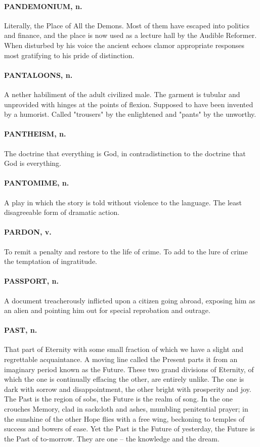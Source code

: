 \documentclass[11pt]{article}
\begin{document}
\paragraph{PANDEMONIUM, n.}  Literally, the Place of All the Demons.  Most of them
have escaped into politics and finance, and the place is now used as a
lecture hall by the Audible Reformer.  When disturbed by his voice the
ancient echoes clamor appropriate responses most gratifying to his
pride of distinction.

\paragraph{PANTALOONS, n.}  A nether habiliment of the adult civilized male.  The
garment is tubular and unprovided with hinges at the points of
flexion.  Supposed to have been invented by a humorist.  Called
"trousers" by the enlightened and "pants" by the unworthy.

\paragraph{PANTHEISM, n.}  The doctrine that everything is God, in
contradistinction to the doctrine that God is everything.

\paragraph{PANTOMIME, n.}  A play in which the story is told without violence to
the language.  The least disagreeable form of dramatic action.

\paragraph{PARDON, v.}  To remit a penalty and restore to the life of crime.  To
add to the lure of crime the temptation of ingratitude.

\paragraph{PASSPORT, n.}  A document treacherously inflicted upon a citizen going
abroad, exposing him as an alien and pointing him out for special
reprobation and outrage.

\paragraph{PAST, n.}  That part of Eternity with some small fraction of which we
have a slight and regrettable acquaintance.  A moving line called the
Present parts it from an imaginary period known as the Future.  These
two grand divisions of Eternity, of which the one is continually
effacing the other, are entirely unlike.  The one is dark with sorrow
and disappointment, the other bright with prosperity and joy.  The
Past is the region of sobs, the Future is the realm of song.  In the
one crouches Memory, clad in sackcloth and ashes, mumbling penitential
prayer; in the sunshine of the other Hope flies with a free wing,
beckoning to temples of success and bowers of ease.  Yet the Past is
the Future of yesterday, the Future is the Past of to-morrow.  They
are one -- the knowledge and the dream.
\end{document}
